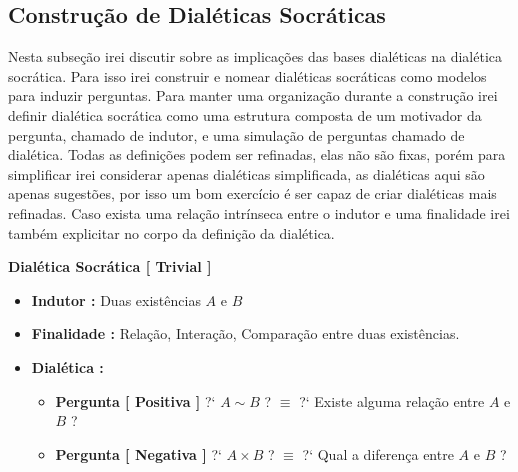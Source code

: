 \documentclass[10pt,a4paper]{report}
\begin{document}

\subsection{Construção de Dialéticas Socráticas}

\hspace{\baselineskip}

Nesta subseção irei discutir sobre as implicações das bases dialéticas na dialética socrática. Para isso irei construir e nomear dialéticas socráticas como modelos para induzir perguntas. Para manter uma organização durante a construção irei definir dialética socrática como uma estrutura composta de um motivador da pergunta, chamado de indutor, e uma simulação de perguntas chamado de dialética. Todas as definições podem ser refinadas, elas não são fixas, porém para simplificar irei considerar apenas dialéticas simplificada, as dialéticas aqui são apenas sugestões, por isso um bom exercício é ser capaz de criar dialéticas mais refinadas. Caso exista uma relação intrínseca entre o indutor e uma finalidade irei também explicitar no corpo da definição da dialética.

\hspace{\baselineskip}

\textbf{Dialética Socrática [ Trivial ]}

\begin{itemize}
	\item[ ] \textbf{Indutor :} Duas existências $A$ e $B$
	\item[ ] \textbf{Finalidade :} Relação, Interação, Comparação entre duas existências.	
	\item[ ] \textbf{Dialética :}
	\begin{itemize}
		\item[ (i) ] \textbf{Pergunta [ Positiva ]} ?` $A \sim B$ ? $\equiv$ ?` Existe alguma relação entre $A$ e $B$ ?
		\item[ (ii) ] \textbf{Pergunta [ Negativa ]} ?` $ A \times B $ ? $\equiv$ ?` Qual a diferença entre $A$ e $B$ ?
	\end{itemize}
\end{itemize}
\end{document}
